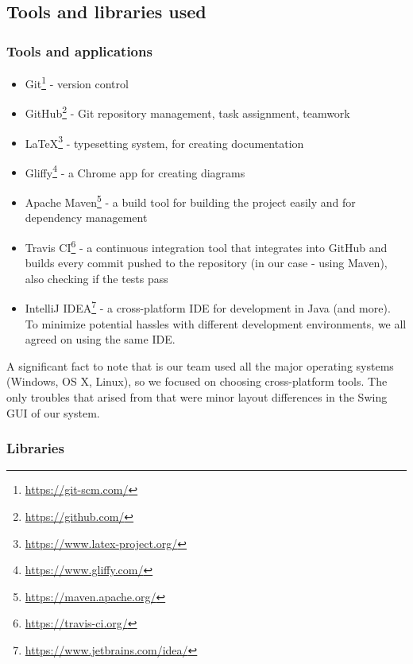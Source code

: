 \documentclass[a4paper,12pt]{article}
\begin{document}
\subsection{Tools and libraries used}

\subsubsection*{Tools and applications}

\begin{itemize}
	\item Git\footnote{\url{https://git-scm.com/}} - version control
	\item GitHub\footnote{\url{https://github.com/}} - Git repository management, task assignment, teamwork
	\item \LaTeX\footnote{\url{https://www.latex-project.org/}} - typesetting system, for creating documentation
	\item Gliffy\footnote{\url{https://www.gliffy.com/}} - a Chrome app for creating diagrams
	\item Apache Maven\footnote{\url{https://maven.apache.org/}} - a build tool for building the project easily and for dependency management
	\item Travis CI\footnote{\url{https://travis-ci.org/}} - a continuous integration tool that integrates into GitHub and builds every commit pushed to the repository (in our case - using Maven), also checking if the tests pass
	\item IntelliJ IDEA\footnote{\url{https://www.jetbrains.com/idea/}} - a cross-platform IDE for development in Java (and more). To minimize potential hassles with different development environments, we all agreed on using the same IDE.
\end{itemize}


A significant fact to note that is our team used all the major operating systems (Windows, OS X, Linux), so we focused on choosing cross-platform tools. The only troubles that arised from that were minor layout differences in the Swing GUI of our system.

\subsubsection*{Libraries}
\end{document}
